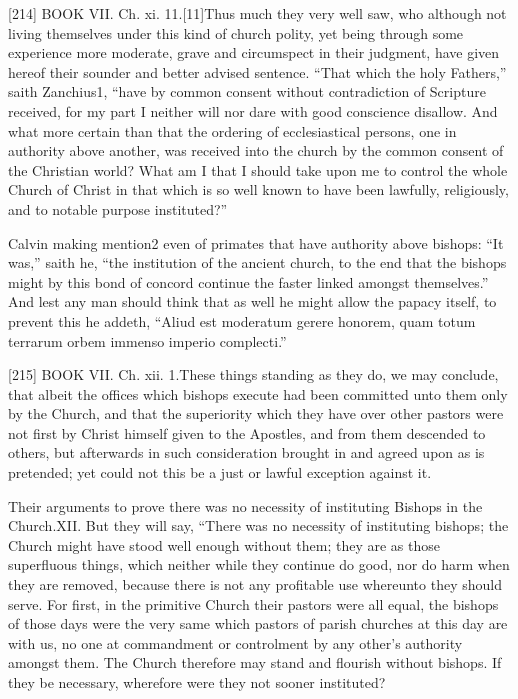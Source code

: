 [214]
BOOK VII. Ch. xi. 11.[11]Thus much they very well saw, who although not living themselves under this kind of church polity, yet being through some experience more moderate, grave and circumspect in their judgment, have given hereof their sounder and better advised sentence. “That which the holy Fathers,” saith Zanchius1, “have by common consent without contradiction of Scripture received, for my part I neither will nor dare with good conscience disallow. And what more certain than that the ordering of ecclesiastical persons, one in authority above another, was received into the church by the common consent of the Christian world? What am I that I should take upon me to control the whole Church of Christ in that which is so well known to have been lawfully, religiously, and to notable purpose instituted?”

Calvin making mention2 even of primates that have authority above bishops: “It was,” saith he, “the institution of the ancient church, to the end that the bishops might by this bond of concord continue the faster linked amongst themselves.” And lest any man should think that as well he might allow the papacy itself, to prevent this he addeth, “Aliud est moderatum gerere honorem, quam totum terrarum orbem immenso imperio complecti.”

[215]
BOOK VII. Ch. xii. 1.These things standing as they do, we may conclude, that albeit the offices which bishops execute had been committed unto them only by the Church, and that the superiority which they have over other pastors were not first by Christ himself given to the Apostles, and from them descended to others, but afterwards in such consideration brought in and agreed upon as is pretended; yet could not this be a just or lawful exception against it.

Their arguments to prove there was no necessity of instituting Bishops in the Church.XII. But they will say, “There was no necessity of instituting bishops; the Church might have stood well enough without them; they are as those superfluous things, which neither while they continue do good, nor do harm when they are removed, because there is not any profitable use whereunto they should serve. For first, in the primitive Church their pastors were all equal, the bishops of those days were the very same which pastors of parish churches at this day are with us, no one at commandment or controlment by any other’s authority amongst them. The Church therefore may stand and flourish without bishops. If they be necessary, wherefore were they not sooner instituted?

